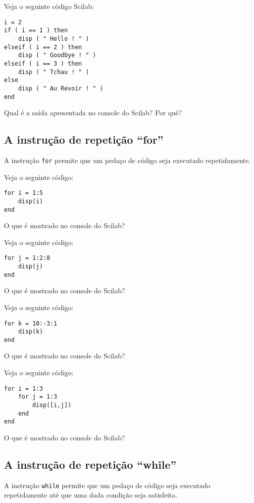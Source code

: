 \begin{ex}
  Veja o seguinte código Scilab:
\begin{verbatim}
i = 2
if ( i == 1 ) then
    disp ( " Hello ! " )
elseif ( i == 2 ) then
    disp ( " Goodbye ! " )
elseif ( i == 3 ) then
    disp ( " Tchau ! " )
else
    disp ( " Au Revoir ! " )
end
\end{verbatim}
Qual é a saída apresentada no console do Scilab? Por quê?
\end{ex}

\subsection{A instrução de repetição ``for''}

A instrução \verb+for+ permite que um pedaço de código seja executado repetidamente.

\begin{ex}
  Veja o seguinte código:
\begin{verbatim}
for i = 1:5
    disp(i)
end
\end{verbatim}
O que é mostrado no console do Scilab?
\end{ex}

\begin{ex}
  Veja o seguinte código:
\begin{verbatim}
for j = 1:2:8
    disp(j)
end
\end{verbatim}
O que é mostrado no console do Scilab?
\end{ex}

\begin{ex}
  Veja o seguinte código:
\begin{verbatim}
for k = 10:-3:1
    disp(k)
end
\end{verbatim}
O que é mostrado no console do Scilab?
\end{ex}

\begin{ex}
  Veja o seguinte código:
\begin{verbatim}
for i = 1:3
    for j = 1:3
        disp([i,j])
    end
end
\end{verbatim}
O que é mostrado no console do Scilab?
\end{ex}

\subsection{A instrução de repetição ``while''}

A instrução \verb+while+ permite que um pedaço de código seja executado repetidamente até que uma dada condição seja satisfeita.

